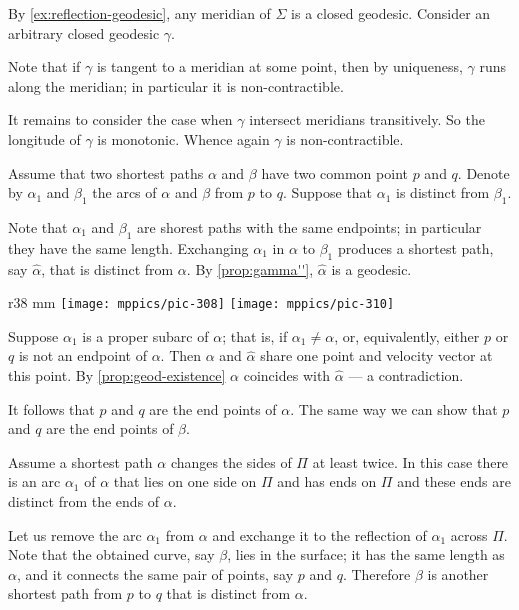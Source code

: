 By \ref{ex:reflection-geodesic}, any meridian of $\Sigma$ is a closed geodesic.
Consider an arbitrary closed geodesic $\gamma$.

Note that if $\gamma$ is tangent to a meridian at some point, then by uniqueness, $\gamma$ runs along the meridian; in particular it is non-contractible.

It remains to consider the case when $\gamma$ intersect meridians transitively.
So the longitude of $\gamma$ is monotonic.
Whence again $\gamma$ is non-contractible.

Assume that two shortest paths $\alpha$ and $\beta$ have two common point $p$ and $q$.
Denote by $\alpha_1$ and $\beta_1$ the arcs of
$\alpha$ and $\beta$ from $p$ to $q$.
Suppose that $\alpha_1$ is distinct from $\beta_1$.

Note that $\alpha_1$ and $\beta_1$ are shorest paths with the same endpoints;
in particular they have the same length.
Exchanging $\alpha_1$ in $\alpha$ to $\beta_1$ produces a shortest path, say $\hat\alpha$, that is distinct from $\alpha$.
By \ref{prop:gamma''}, $\hat\alpha$ is a geodesic.

\begin{wrapfigure}[11]{r}{38 mm}
\vskip-5mm
\centering
\texttt{[image: mppics/pic-308]}
\bigskip
\texttt{[image: mppics/pic-310]}
\vskip0mm
\end{wrapfigure}

Suppose $\alpha_1$ is a proper subarc of $\alpha$;
that is, if $\alpha_1\ne\alpha$, or, equivalently, either $p$ or $q$ is not an endpoint of $\alpha$.
Then $\alpha$ and $\hat\alpha$ share one point and velocity vector at this point.
By \ref{prop:geod-existence} $\alpha$ coincides with $\hat\alpha$ --- a contradiction.

It follows that $p$ and $q$ are the end points of $\alpha$.
The same way we can show that $p$ and $q$ are the end points of $\beta$.

Assume a shortest path $\alpha$ changes the sides of $\Pi$ at least twice.
In this case there is an arc $\alpha_1$ of $\alpha$ that lies on one side on $\Pi$ and has ends on $\Pi$ and these ends are distinct from the ends of $\alpha$.

Let us remove the arc $\alpha_1$ from $\alpha$ and exchange it to the reflection of $\alpha_1$ across $\Pi$.
Note that the obtained curve, say $\beta$, lies in the surface; it has the same length as $\alpha$, and it connects the same pair of points, say $p$ and $q$.
Therefore $\beta$ is another shortest path from $p$ to $q$ that is distinct from $\alpha$.

